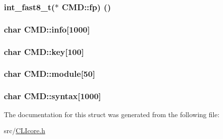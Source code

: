 \subsubsection[{fp}]{\setlength{\rightskip}{0pt plus 5cm}int\+\_\+fast8\+\_\+t($\ast$  C\+M\+D\+::fp) ()}\label{structCMD_ae8ee9d3a38444931eae3f8988af15acb}
\hypertarget{structCMD_a008f20bb66a74f15dc4e9536ca19dd9a}{}
\subsubsection[{info}]{\setlength{\rightskip}{0pt plus 5cm}char C\+M\+D\+::info\mbox{[}1000\mbox{]}}\label{structCMD_a008f20bb66a74f15dc4e9536ca19dd9a}
\hypertarget{structCMD_ab3aedae0ea688867922c5db16e0c136f}{}
\subsubsection[{key}]{\setlength{\rightskip}{0pt plus 5cm}char C\+M\+D\+::key\mbox{[}100\mbox{]}}\label{structCMD_ab3aedae0ea688867922c5db16e0c136f}
\hypertarget{structCMD_a4cdcd2100bc392217fc7b794e20a261a}{}
\subsubsection[{module}]{\setlength{\rightskip}{0pt plus 5cm}char C\+M\+D\+::module\mbox{[}50\mbox{]}}\label{structCMD_a4cdcd2100bc392217fc7b794e20a261a}
\hypertarget{structCMD_af841a2189f9e693dd3ec530d368d3e92}{}
\subsubsection[{syntax}]{\setlength{\rightskip}{0pt plus 5cm}char C\+M\+D\+::syntax\mbox{[}1000\mbox{]}}\label{structCMD_af841a2189f9e693dd3ec530d368d3e92}


The documentation for this struct was generated from the following file\+:\begin{DoxyCompactItemize}
\item 
src/\hyperlink{CLIcore_8h}{C\+L\+Icore.\+h}\end{DoxyCompactItemize}

